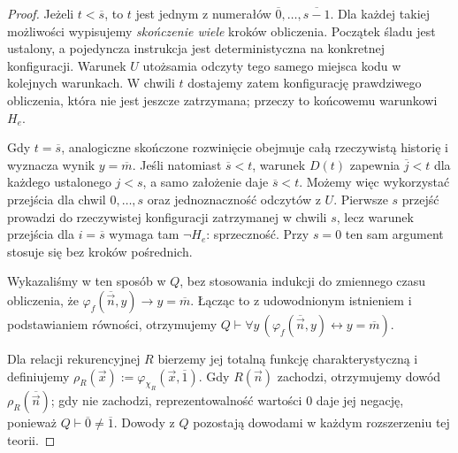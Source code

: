 \begin{proof}
Jeżeli $t<\overline s$, to $t$ jest jednym z numerałów $\overline0,\ldots,\overline{s-1}$. Dla każdej takiej możliwości wypisujemy \emph{skończenie wiele} kroków obliczenia. Początek śladu jest ustalony, a pojedyncza instrukcja jest deterministyczna na konkretnej konfiguracji. Warunek $U$ utożsamia odczyty tego samego miejsca kodu w kolejnych warunkach. W chwili $t$ dostajemy zatem konfigurację prawdziwego obliczenia, która nie jest jeszcze zatrzymana; przeczy to końcowemu warunkowi $H_e$.

Gdy $t=\overline s$, analogiczne skończone rozwinięcie obejmuje całą rzeczywistą historię i wyznacza wynik $y=\overline m$. Jeśli natomiast $\overline s<t$, warunek $D(t)$ zapewnia $\overline j<t$ dla każdego ustalonego $j<s$, a samo założenie daje $\overline s<t$. Możemy więc wykorzystać przejścia dla chwil $0,\ldots,s$ oraz jednoznaczność odczytów z $U$. Pierwsze $s$ przejść prowadzi do rzeczywistej konfiguracji zatrzymanej w chwili $s$, lecz warunek przejścia dla $i=\overline s$ wymaga tam $\neg H_e$: sprzeczność. Przy $s=0$ ten sam argument stosuje się bez kroków pośrednich.

Wykazaliśmy w ten sposób w $Q$, bez stosowania indukcji do zmiennego czasu obliczenia, że
$\varphi_f(\overline{\vec n},y)\to y=\overline m$.
Łącząc to z udowodnionym istnieniem i podstawianiem równości, otrzymujemy
$Q\vdash\forall y\,(\varphi_f(\overline{\vec n},y)\leftrightarrow y=\overline m)$.

Dla relacji rekurencyjnej $R$ bierzemy jej totalną funkcję charakterystyczną i definiujemy $\rho_R(\vec x):=\varphi_{\chi_R}(\vec x,\overline1)$. Gdy $R(\vec n)$ zachodzi, otrzymujemy dowód $\rho_R(\overline{\vec n})$; gdy nie zachodzi, reprezentowalność wartości $0$ daje jej negację, ponieważ $Q\vdash\overline0\ne\overline1$. Dowody z $Q$ pozostają dowodami w każdym rozszerzeniu tej teorii.
\end{proof}

